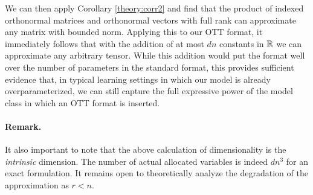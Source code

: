 We can then apply Corollary \ref{theory:corr2} and find that the product of indexed orthonormal matrices and orthonormal vectors with full rank can approximate any matrix with bounded norm. 
Applying this to our OTT format, it immediately follows that with  the addition of at most $dn$ constants in $\mathbb{R}$ we can approximate any arbitrary tensor. While this addition would put the format well over the number of parameters in the standard format, this provides sufficient evidence that, in typical learning settings in which our model is already overparameterized, we can still capture the full expressive power of the model class in which an OTT format is inserted. 

\paragraph{Remark.} It also important to note that the above calculation of dimensionality is the \textit{intrinsic} dimension. The number of actual allocated variables is indeed $dn^3$ for an exact formulation.
It remains open to theoretically analyze the degradation of the approximation as $r<n$.

